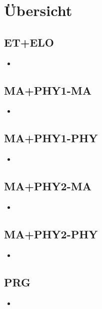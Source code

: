 
\section{Übersicht}

\subsection{ET+ELO}
\begin{itemize}
  \item 
\end{itemize}

\subsection{MA+PHY1-MA}
\begin{itemize}
  \item 
\end{itemize}

\subsection{MA+PHY1-PHY}
\begin{itemize}
  \item 
\end{itemize}

\subsection{MA+PHY2-MA}
\begin{itemize}
  \item 
\end{itemize}

\subsection{MA+PHY2-PHY}
\begin{itemize}
  \item 
\end{itemize}

\subsection{PRG}
\begin{itemize}
  \item 
\end{itemize}
